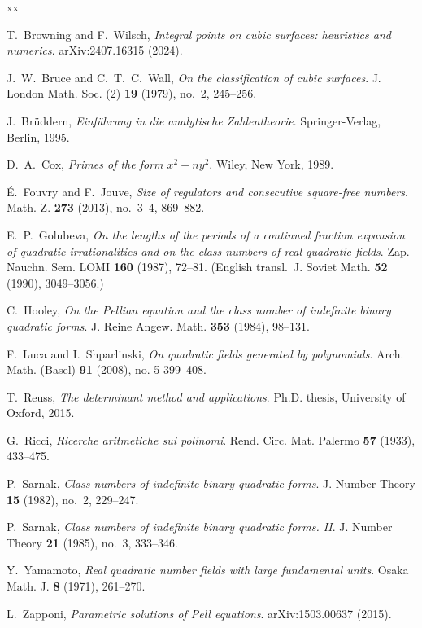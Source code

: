 \documentclass[reqno, 11pt, twoside]{amsart}
\numberwithin{equation}{section}
\theoremstyle{definition}
\begin{document}
\begin{thebibliography}{xx}



{\sc T.~Browning} and {\sc F.~Wilsch},
\textit{Integral points on cubic surfaces: heuristics and numerics}.
arXiv:2407.16315 (2024).

{\sc J.~W.~Bruce} and {\sc C.~T.~C.~Wall},
\textit{On the classification of cubic surfaces}.
J. London Math. Soc. (2) {\bf19} (1979), no.~2, 245--256.

{\sc J.~Br\"uddern},
\textit{Einf\"uhrung in die analytische Zahlentheorie}.
Springer-Verlag, Berlin, 1995.

{\sc D.~A.~Cox},
\textit{Primes of the form $x^2+ny^2$}.
Wiley, New York, 1989.

{\sc \'E.~Fouvry} and {\sc F.~Jouve},
\textit{Size of regulators and consecutive square-free numbers}.
Math. Z. {\bf273} (2013), no.~3--4, 869--882.

{\sc E.~P.~Golubeva},
\textit{On the lengths of the periods of a continued fraction expansion of quadratic irrationalities and on the class numbers of real quadratic fields}.
Zap. Nauchn. Sem. LOMI {\bf160} (1987), 72--81. (English transl.\ J. Soviet Math. {\bf52} (1990), 3049--3056.)

{\sc C.~Hooley},
\textit{On the Pellian equation and the class number of indefinite binary quadratic forms}.
J. Reine Angew. Math. {\bf353} (1984), 98--131.

{\sc F.~Luca} and {\sc I.~Shparlinski},
\textit{On quadratic fields generated by polynomials}.
Arch. Math. (Basel) {\bf91} (2008), no. 5 399--408.

{\sc T.~Reuss},
\textit{The determinant method and applications}.
Ph.D. thesis, University of Oxford, 2015.

{\sc G.~Ricci},
\textit{Ricerche aritmetiche sui polinomi}.
Rend. Circ. Mat. Palermo {\bf57} (1933), 433--475.

{\sc P.~Sarnak},
\textit{Class numbers of indefinite binary quadratic forms}.
J. Number Theory {\bf15} (1982), no.~2, 229--247.

{\sc P.~Sarnak},
\textit{Class numbers of indefinite binary quadratic forms. II}.
J. Number Theory {\bf21} (1985), no.~3, 333--346.

{\sc Y.~Yamamoto},
\textit{Real quadratic number fields with large fundamental units}.
Osaka Math. J. {\bf8} (1971), 261--270.

{\sc L.~Zapponi},
\textit{Parametric solutions of Pell equations}.
arXiv:1503.00637 (2015).

\end{thebibliography}
\end{document}
